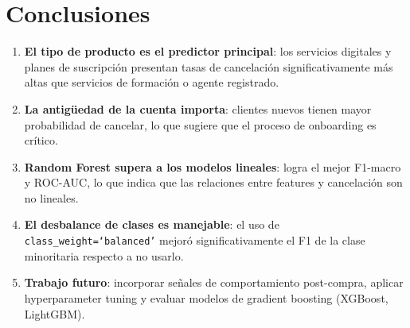 \documentclass[12pt,letterpaper]{article}
\begin{document}
\section{Conclusiones}

\begin{enumerate}
  \item \textbf{El tipo de producto es el predictor principal}: los servicios digitales
  y planes de suscripción presentan tasas de cancelación significativamente más altas
  que servicios de formación o agente registrado.

  \item \textbf{La antigüedad de la cuenta importa}: clientes nuevos tienen mayor
  probabilidad de cancelar, lo que sugiere que el proceso de onboarding es crítico.

  \item \textbf{Random Forest supera a los modelos lineales}: logra el mejor F1-macro
  y ROC-AUC, lo que indica que las relaciones entre features y cancelación son
  no lineales.

  \item \textbf{El desbalance de clases es manejable}: el uso de \texttt{class\_weight=`balanced'}
  mejoró significativamente el F1 de la clase minoritaria respecto a no usarlo.

  \item \textbf{Trabajo futuro}: incorporar señales de comportamiento post-compra,
  aplicar hyperparameter tuning y evaluar modelos de gradient boosting (XGBoost, LightGBM).
\end{enumerate}

\end{document}
